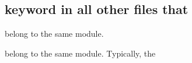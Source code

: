 \hypertarget{a00046}{\subsection{keyword in all other files that}
\label{a00046}
}


belong to the same module.  


belong to the same module. \-Typically, the 